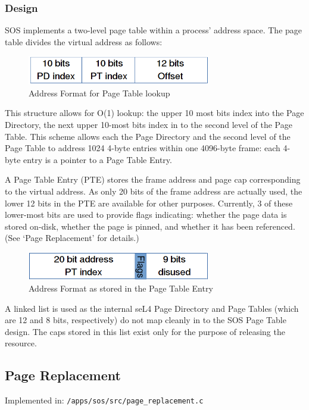 \documentclass[a4paper,12pt]{article}
\begin{document}
\subsubsection{Design}
SOS implements a two-level page table within a process' address space.  The
page table divides the virtual address as follows:

\begin{figure}[h!]
  \centering
  \includegraphics[width=80mm]{add-format.png}
  \caption{Address Format for Page Table lookup}
\end{figure}

This structure allows for O(1) lookup: the upper 10 most bits index
into the Page Directory, the next upper 10-most bits index in to the second
level of the Page Table.  This scheme allows each the Page Directory and the
second level of the Page Table to address 1024 4-byte entries within one
4096-byte frame: each 4-byte entry is a pointer to a Page Table Entry.

A Page Table Entry (PTE) stores the frame address and page cap corresponding
to the virtual address.  As only 20 bits of the frame address are actually
used, the lower 12 bits in the PTE are available for other purposes.
Currently, 3 of these lower-most bits are used to provide flags indicating:
whether the page data is stored on-disk, whether the page is pinned, and
whether it has been referenced.  (See `Page Replacement' for details.)

\begin{figure}[h!]
  \centering
  \includegraphics[width=80mm]{pte-addr-format.png}
  \caption{Address Format as stored in the Page Table Entry}
\end{figure}

A linked list is used as the internal seL4 Page Directory and Page Tables
(which are 12 and 8 bits, respectively) do not map cleanly in to the SOS Page
Table design.  The caps stored in this list exist only for the purpose of
releasing the resource.

\subsection{Page Replacement}
Implemented in: \texttt{/apps/sos/src/page_replacement.c}
\end{document}
